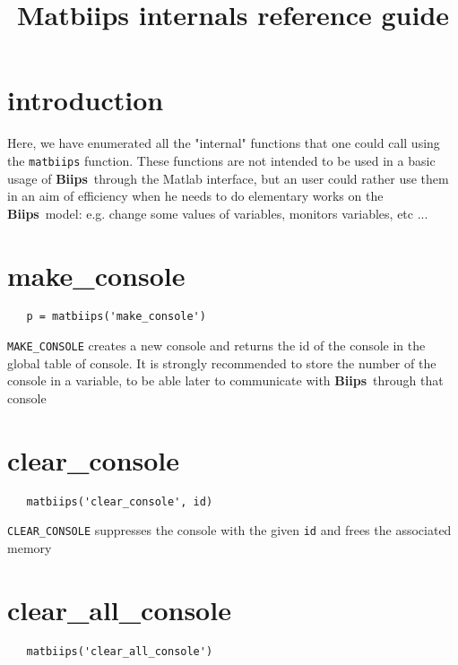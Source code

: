 \documentclass[11pt,twoside]{article}
\newcommand{\biips}{{\bf Biips}{}}
\begin{document}
\title{Matbiips internals reference guide}
\date{}

\maketitle

\tableofcontents

\section{introduction}

  Here, we have enumerated all the "internal" functions that one could call using the \texttt{matbiips} function. These functions are not intended
  to be used in a basic usage of \biips\ through the Matlab interface, but an user could rather use them in an aim of efficiency when he needs to
  do elementary works on the \biips\ model: e.g. change some values of variables, monitors variables, etc ...

\section{make\_console}
 \begin{lstlisting}
   p = matbiips('make_console')
 \end{lstlisting}

   \texttt{MAKE\_CONSOLE}  creates a new console and returns the id of the console in the global table of console. It
   is strongly recommended to store the number of the console in a variable, to be able later to communicate with \biips\  through that
   console

\section{clear\_console}

 \begin{lstlisting}
   matbiips('clear_console', id)
 \end{lstlisting}

  \texttt{CLEAR\_CONSOLE} suppresses the console with the given \texttt{id} and frees the associated memory

\section{clear\_all\_console}

 \begin{lstlisting}
   matbiips('clear_all_console')
 \end{lstlisting}
\end{document}
